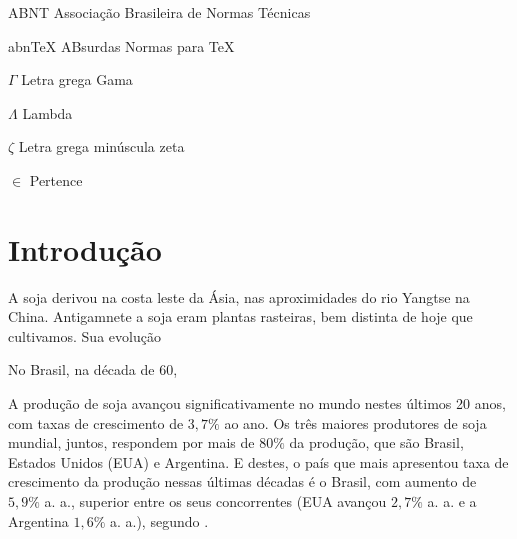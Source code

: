 \documentclass[
	12pt,				%
	openright,			%
	oneside,      %
	a4paper,			%
	english,			%
	french,				%
	spanish,			%
	brazil,				%
	]{abntex2}\usepackage[]{graphicx}\usepackage[]{xcolor}
\begin{document}
\listoffigures*
\cleardoublepage

\listoftables*
\cleardoublepage

\begin{siglas}
  \item[ABNT] Associação Brasileira de Normas Técnicas
  \item[abnTeX] ABsurdas Normas para TeX
\end{siglas}

\begin{simbolos}
  \item[$ \Gamma $] Letra grega Gama
  \item[$ \Lambda $] Lambda
  \item[$ \zeta $] Letra grega minúscula zeta
  \item[$ \in $] Pertence
\end{simbolos}

\tableofcontents*
\cleardoublepage

\textual

\chapter[Introdução]{Introdução}

A soja derivou na costa leste da Ásia, nas aproximidades do rio Yangtse na China. Antigamnete a soja eram plantas rasteiras, bem distinta de hoje que cultivamos. Sua 
evolução 



No Brasil, na década de 60, 


A produção de soja avançou significativamente no mundo nestes últimos 20 anos, com taxas 
de crescimento de $3,7\%$ ao ano. Os três maiores produtores de soja mundial, juntos, respondem por mais de $80\%$ da produção, que são Brasil, Estados Unidos (EUA) e Argentina. E destes, o país que mais apresentou taxa de crescimento da produção nessas últimas décadas é o Brasil, com aumento de $5,9\%$ a. a., superior entre os seus concorrentes (EUA avançou $2,7\%$ a. a. e a Argentina $1,6\%$ a. a.), segundo \cite{cepea2022}. 
\end{document}
